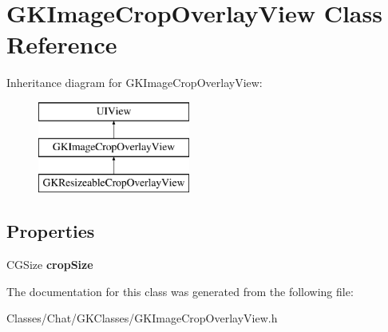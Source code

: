 \hypertarget{interface_g_k_image_crop_overlay_view}{}\section{G\+K\+Image\+Crop\+Overlay\+View Class Reference}
\label{interface_g_k_image_crop_overlay_view}
Inheritance diagram for G\+K\+Image\+Crop\+Overlay\+View\+:\begin{figure}[H]
\begin{center}
\leavevmode
\includegraphics[height=3.000000cm]{interface_g_k_image_crop_overlay_view}
\end{center}
\end{figure}
\subsection*{Properties}
\begin{DoxyCompactItemize}
\item 
\hypertarget{interface_g_k_image_crop_overlay_view_a9bc2fd426cd88ed529d8167daa7934d8}{}C\+G\+Size {\bfseries crop\+Size}\label{interface_g_k_image_crop_overlay_view_a9bc2fd426cd88ed529d8167daa7934d8}

\end{DoxyCompactItemize}


The documentation for this class was generated from the following file\+:\begin{DoxyCompactItemize}
\item 
Classes/\+Chat/\+G\+K\+Classes/G\+K\+Image\+Crop\+Overlay\+View.\+h\end{DoxyCompactItemize}

